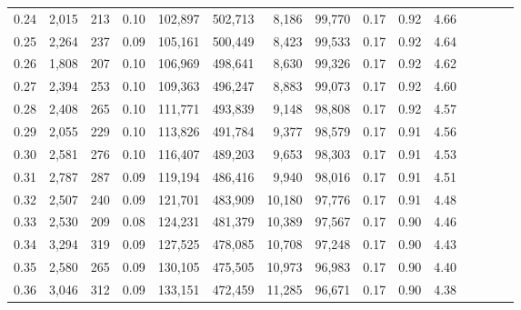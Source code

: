 \begin{tabular}{rrrcrrrrrrrrrrr}
0.24 &   2,015 &     213 &                                       0.10 &  102,897 &  502,713 &    8,186 &   99,770 &  0.17 &  0.92 &                         4.66 \\
0.25 &   2,264 &     237 &                                       0.09 &  105,161 &  500,449 &    8,423 &   99,533 &  0.17 &  0.92 &                         4.64 \\
0.26 &   1,808 &     207 &                                       0.10 &  106,969 &  498,641 &    8,630 &   99,326 &  0.17 &  0.92 &                         4.62 \\
0.27 &   2,394 &     253 &                                       0.10 &  109,363 &  496,247 &    8,883 &   99,073 &  0.17 &  0.92 &                         4.60 \\
0.28 &   2,408 &     265 &                                       0.10 &  111,771 &  493,839 &    9,148 &   98,808 &  0.17 &  0.92 &                         4.57 \\
0.29 &   2,055 &     229 &                                       0.10 &  113,826 &  491,784 &    9,377 &   98,579 &  0.17 &  0.91 &                         4.56 \\
0.30 &   2,581 &     276 &                                       0.10 &  116,407 &  489,203 &    9,653 &   98,303 &  0.17 &  0.91 &                         4.53 \\
0.31 &   2,787 &     287 &                                       0.09 &  119,194 &  486,416 &    9,940 &   98,016 &  0.17 &  0.91 &                         4.51 \\
0.32 &   2,507 &     240 &                                       0.09 &  121,701 &  483,909 &   10,180 &   97,776 &  0.17 &  0.91 &                         4.48 \\
0.33 &   2,530 &     209 &                                       0.08 &  124,231 &  481,379 &   10,389 &   97,567 &  0.17 &  0.90 &                         4.46 \\
0.34 &   3,294 &     319 &                                       0.09 &  127,525 &  478,085 &   10,708 &   97,248 &  0.17 &  0.90 &                         4.43 \\
0.35 &   2,580 &     265 &                                       0.09 &  130,105 &  475,505 &   10,973 &   96,983 &  0.17 &  0.90 &                         4.40 \\
0.36 &   3,046 &     312 &                                       0.09 &  133,151 &  472,459 &   11,285 &   96,671 &  0.17 &  0.90 &                         4.38 \\

\end{tabular}
